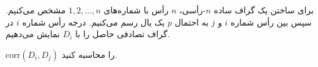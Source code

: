 \problem{}

برای ساختن یک گراف ساده \( n \)-رأسی، \( n \) رأس با شماره‌های \( 1, 2, \dots, n \) مشخص می‌کنیم. سپس بین رأس شماره \( i \) و \( j \) به احتمال \( p \) یک یال رسم می‌کنیم. درجه رأس شماره \( i \) در گراف تصادفی حاصل را با \( D_i \) نمایش می‌دهیم. 

 \( \text{corr}(D_i, D_j) \) را محاسبه کنید.
